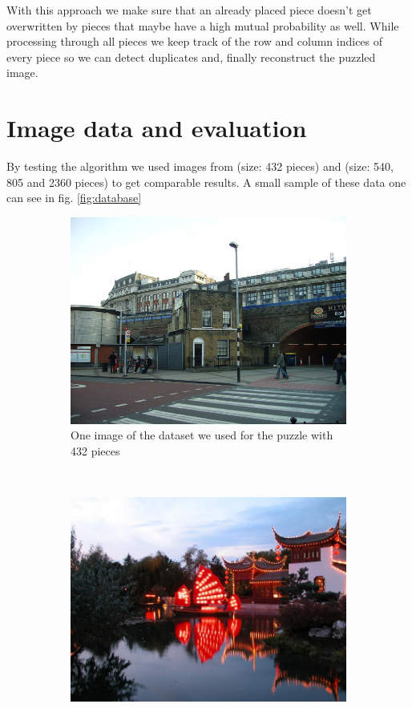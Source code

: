 \documentclass[]{report}
\begin{document}
With this approach we make sure that an already placed piece doesn't get overwritten by pieces that maybe have a high mutual probability as well. While processing through all pieces we keep track of the row and column indices of every piece so we can detect duplicates and, finally reconstruct the puzzled image.
\newpage

\section{Image data and evaluation}
By testing the algorithm we used images from \cite{Cho2010} (size: 432 pieces) and \cite{Pomeranz2011} (size: 540, 805 and 2360 pieces) to get comparable results. A small sample of these data one can see in fig. \ref{fig:database}

\begin{figure}
	\centering
	\begin{subfigure}[b]{0.45\textwidth}
		\includegraphics[width=\textwidth]{../imData/432/1.png}
		\caption{One image of the dataset we used for the puzzle with 432 pieces}
		\label{img:432}
	\end{subfigure}
	~
	\begin{subfigure}[b]{0.45\textwidth}
		\includegraphics[width=\textwidth]{../imData/540/1.jpg}

\end{subfigure}
\end{figure}
\end{document}
